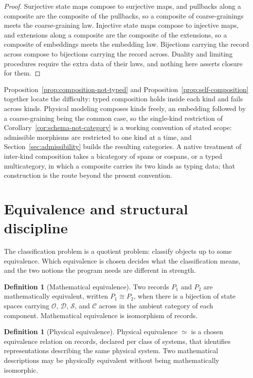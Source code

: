 \documentclass[11pt,letterpaper]{article}
\theoremstyle{definition}
\newtheorem{definition}[theorem]{Definition}
\theoremstyle{remark}
\begin{document}
\begin{proof}
Surjective state maps compose to surjective maps, and pullbacks along a composite are the composite of the pullbacks, so a composite of coarse-grainings meets the coarse-graining law. Injective state maps compose to injective maps, and extensions along a composite are the composite of the extensions, so a composite of embeddings meets the embedding law. Bijections carrying the record across compose to bijections carrying the record across. Duality and limiting procedures require the extra data of their laws, and nothing here asserts closure for them.
\end{proof}

Proposition~\ref{prop:composition-not-typed} and Proposition~\ref{prop:self-composition} together locate the difficulty: typed composition holds inside each kind and fails across kinds. Physical modeling composes kinds freely, an embedding followed by a coarse-graining being the common case, so the single-kind restriction of Corollary~\ref{cor:schema-not-category} is a working convention of stated scope: admissible morphisms are restricted to one kind at a time, and Section~\ref{sec:admissibility} builds the resulting categories. A native treatment of inter-kind composition takes a bicategory of spans or cospans, or a typed multicategory, in which a composite carries its two kinds as typing data; that construction is the route beyond the present convention.

\section{Equivalence and structural discipline}
\label{sec:equivalence}

The classification problem is a quotient problem: classify objects up to some equivalence. Which equivalence is chosen decides what the classification means, and the two notions the program needs are different in strength.

\begin{definition}[Mathematical equivalence]
\label{def:math-equiv}
Two records $P_1$ and $P_2$ are mathematically equivalent, written $P_1 \cong P_2$, when there is a bijection of state spaces carrying $\mathcal{O}$, $\mathcal{D}$, $\mathcal{S}$, and $\mathcal{C}$ across in the ambient category of each component. Mathematical equivalence is isomorphism of records.
\end{definition}

\begin{definition}[Physical equivalence]
\label{def:phys-equiv}
Physical equivalence $\simeq$ is a chosen equivalence relation on records, declared per class of systems, that identifies representations describing the same physical system. Two mathematical descriptions may be physically equivalent without being mathematically isomorphic.
\end{definition}
\end{document}
